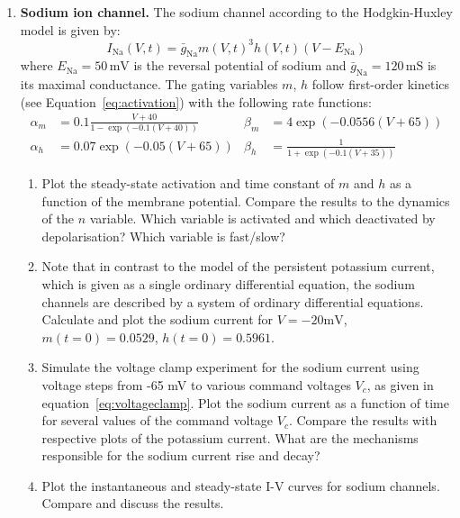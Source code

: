 \documentclass[12pt]{article}
\newcommand{\Na}{\text{Na}}
\begin{document}
\begin{enumerate}
\item \textbf{Sodium ion channel.} The sodium channel according
    to the Hodgkin-Huxley model is given by:
    \begin{equation}
        I_{\Na}(V,t)=\bar{g}_{\Na}m(V,t)^3h(V,t)(V-E_{\Na})
    \end{equation}
    where $E_{\Na}=50\,\mathrm{mV}$ is the reversal potential of sodium and
    $\bar{g}_{\Na}=120\,\mathrm{mS}$ is its maximal conductance.
    The gating variables $m$, $h$ follow first-order kinetics (see
    Equation~\ref{eq:activation}) with the following rate functions:
    \begin{align}
        \alpha_m&=0.1\frac{V+40}{1-\exp(-0.1(V+40))} &
        \beta_m&=4\exp(-0.0556(V+65)) \\
        \alpha_h&=0.07\exp(-0.05(V+65)) &
        \beta_h&=\frac{1}{1+\exp(-0.1(V+35))}
        \label{eq:Na_gating}
    \end{align}

    \begin{enumerate}
    \item Plot the steady-state activation and time constant of $m$ and $h$ as
        a function of the membrane potential. Compare the results to the
        dynamics of the $n$ variable. Which variable is activated and which
        deactivated by depolarisation? Which variable is fast/slow?
    \item Note that in contrast to the model of the persistent potassium
        current, which is given as a single ordinary differential equation, the
        sodium channels are described by a system of ordinary
        differential equations.
        Calculate and plot the sodium current for $V=-20\text{mV}$,
        $m(t=0)=0.0529$, $h(t=0)=0.5961$.
    \item Simulate the voltage clamp experiment for the sodium current using
        voltage steps from -65 mV to various command voltages $V_c$, as given
        in equation~\ref{eq:voltageclamp}. Plot the sodium current as a
        function of time for several values of the command voltage $V_c$.
        Compare the results with respective plots of the potassium
        current. What are the mechanisms responsible for the sodium
        current rise and decay?
    \item Plot the instantaneous and steady-state I-V curves for sodium
        channels. Compare and discuss the results.
\end{enumerate}


\end{enumerate}
\end{document}
